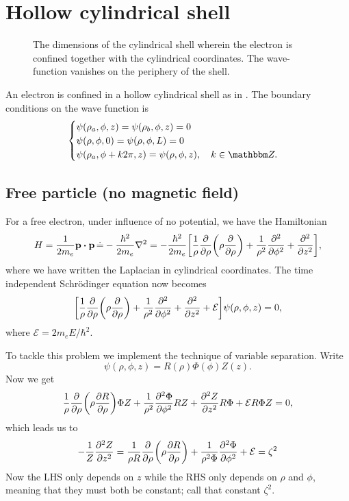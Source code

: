 \documentclass[11pt,letter, swedish, english
]{article}
\begin{document}
\section{Hollow cylindrical shell}
\newcommand{\E}{\ensuremath{\mathcal{E}}}

\begin{figure}\centering
\resizebox{.3\textwidth}{!}{}
\caption{The dimensions of the cylindrical shell wherein the electron
  is confined together with the cylindrical coordinates. The
  wave-function vanishes on the periphery of the shell.}
\label{fig:cylinder}
\end{figure}

An electron is confined in a hollow cylindrical shell as in
. The boundary conditions on the wave function is
\begin{equation}
\begin{cases}
\psi(\rho_a, \phi, z)=\psi(\rho_b, \phi, z)=0\\
\psi(\rho, \phi, 0)=\psi(\rho, \phi, L)=0\\
\psi(\rho_a, \phi+k2\pi, z)=\psi(\rho, \phi, z)\qcomma k\in\Z.
\end{cases}
\end{equation}

\subsection{Free particle (no magnetic field)}
For a free electron, under influence of no potential, we have the
Hamiltonian 
\begin{equation}
H=\frac{1}{2m_e}\vb{p}\vdot\vb{p} \,\dot{=}-\frac{\hbar^2}{2m_e}\laplacian
=-\frac{\hbar^2}{2m_e}\qty[
\frac{1}{\rho}\pdv{\rho}\qty(\rho\pdv{\rho})
+\frac{1}{\rho^2}\pdv[2]{\phi} + \pdv[2]{z}],
\end{equation}
where we have written the Laplacian in cylindrical coordinates.
The time independent Schrödinger equation now becomes
\begin{equation}\label{eq:5a_SE}
\qty[
\frac{1}{\rho}\pdv{\rho}\qty(\rho\pdv{\rho})
+\frac{1}{\rho^2}\pdv[2]{\phi} + \pdv[2]{z}
+\E]\psi(\rho, \phi, z)=0,
\end{equation}
where $\E=2m_eE/\hbar^2$.

To tackle this problem we implement the technique of variable
separation. Write
\begin{equation}
\psi(\rho, \phi, z)=R(\rho)\Phi(\phi)Z(z).
\end{equation}
Now we get
\begin{equation}
\frac{1}{\rho}\pdv{\rho}\qty(\rho\pdv{R}{\rho})\Phi Z
+\frac{1}{\rho^2}\pdv[2]{\Phi}{\phi}RZ + 
\pdv[2]{Z}{z}R\Phi
+\E R\Phi Z=0,
\end{equation}
which leads us to
\begin{equation}
-\frac{1}{Z}\pdv[2]{Z}{z}
=\frac{1}{\rho R}\pdv{\rho}\qty(\rho\pdv{R}{\rho})
+\frac{1}{\rho^2\Phi}\pdv[2]{\Phi}{\phi}
+\E = \zeta^2
\end{equation}
Now the LHS only depends on $z$ while the RHS only depends on $\rho$
and $\phi$, meaning that they must both be constant; call that
constant $\zeta^2$. 
\end{document}
